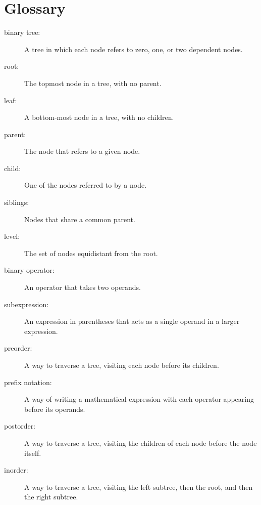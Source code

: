\section{Glossary}

\begin{description}

\item[binary tree:]  A tree in which each node refers to zero, one, or
two dependent nodes.

\item[root:]  The topmost node in a tree, with no parent.

\item[leaf:]  A bottom-most node in a tree, with no children.

\item[parent:]  The node that refers to a given node.

\item[child:]  One of the nodes referred to by a node.

\item[siblings:]  Nodes that share a common parent.

\item[level:]  The set of nodes equidistant from the root.

\item[binary operator:]  An operator that takes two operands.

\item[subexpression:]  An expression in parentheses that acts
as a single operand in a larger expression.

\item[preorder:]  A way to traverse a tree, visiting each node
before its children.

\item[prefix notation:]  A way of writing a mathematical expression
with each operator appearing before its operands.

\item[postorder:]  A way to traverse a tree, visiting the children
of each node before the node itself.

\item[inorder:]  A way to traverse a tree, visiting the left subtree,
then the root, and then the right subtree.

\end{description}






